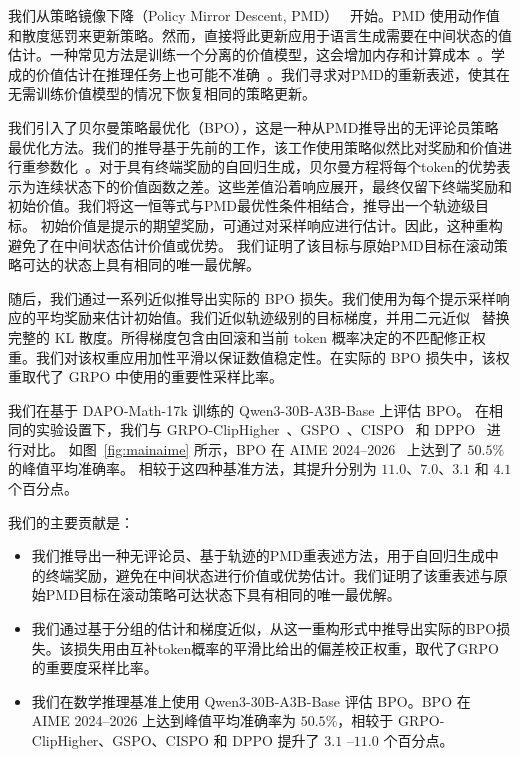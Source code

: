 \documentclass[11pt]{article}
\theoremstyle{definition}
\begin{document}
我们从策略镜像下降（Policy Mirror Descent, PMD）~\cite{lan2023policy,xiao2022convergence} 开始。PMD 使用动作值和散度惩罚来更新策略。然而，直接将此更新应用于语言生成需要在中间状态的值估计。一种常见方法是训练一个分离的价值模型，这会增加内存和计算成本~\cite{shao2024deepseekmath}。学成的价值估计在推理任务上也可能不准确~\cite{pmlr-v267-kazemnejad25a}。我们寻求对PMD的重新表述，使其在无需训练价值模型的情况下恢复相同的策略更新。

我们引入了贝尔曼策略最优化（BPO），这是一种从PMD推导出的无评论员策略最优化方法。我们的推导基于先前的工作，该工作使用策略似然比对奖励和价值进行重参数化~\cite{rafailov2023direct,zeng2024token,rafailovr,kang2026vimpo}。对于具有终端奖励的自回归生成，贝尔曼方程将每个token的优势表示为连续状态下的价值函数之差。这些差值沿着响应展开，最终仅留下终端奖励和初始价值。我们将这一恒等式与PMD最优性条件相结合，推导出一个轨迹级目标。  
初始价值是提示的期望奖励，可通过对采样响应进行估计。因此，这种重构避免了在中间状态估计价值或优势。  
我们证明了该目标与原始PMD目标在滚动策略可达的状态上具有相同的唯一最优解。 

随后，我们通过一系列近似推导出实际的 BPO 损失。我们使用为每个提示采样响应的平均奖励来估计初始值。我们近似轨迹级别的目标梯度，并用二元近似~\cite{qi2026rethinking} 替换完整的 KL 散度。所得梯度包含由回滚和当前 token 概率决定的不匹配修正权重。我们对该权重应用加性平滑以保证数值稳定性。在实际的 BPO 损失中，该权重取代了 GRPO 中使用的重要性采样比率。 

我们在基于 DAPO-Math-17k 训练的 Qwen3-30B-A3B-Base 上评估 BPO。  
在相同的实验设置下，我们与 GRPO-ClipHigher~\cite{shao2024deepseekmath,yu2026dapo}、GSPO~\cite{zheng2025gspo}、CISPO~\cite{chen2025minimax} 和 DPPO~\cite{qi2026rethinking} 进行对比。  
如图~\ref{fig:mainaime} 所示，BPO 在 AIME 2024--2026~\cite{aimeproblems} 上达到了 $50.5\%$ 的峰值平均准确率。  
相较于这四种基准方法，其提升分别为 $11.0$、$7.0$、$3.1$ 和 $4.1$ 个百分点。

我们的主要贡献是：

\begin{itemize}
\item 我们推导出一种无评论员、基于轨迹的PMD重表述方法，用于自回归生成中的终端奖励，避免在中间状态进行价值或优势估计。我们证明了该重表述与原始PMD目标在滚动策略可达状态下具有相同的唯一最优解。

\item 我们通过基于分组的估计和梯度近似，从这一重构形式中推导出实际的BPO损失。该损失用由互补token概率的平滑比给出的偏差校正权重，取代了GRPO的重要度采样比率。

\item 我们在数学推理基准上使用 Qwen3-30B-A3B-Base 评估 BPO。BPO 在 AIME 2024--2026 上达到峰值平均准确率为 $50.5\%$，相较于 GRPO-ClipHigher、GSPO、CISPO 和 DPPO 提升了 $3.1$ --$11.0$ 个百分点。

\end{itemize}
\end{document}
